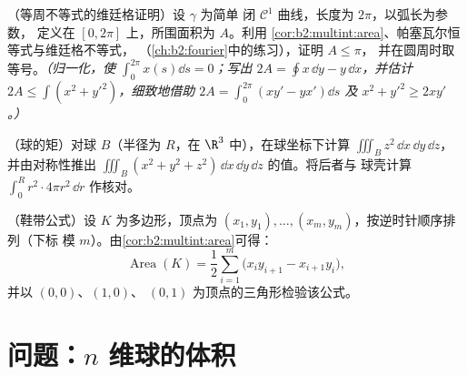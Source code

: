 \begin{exercise}[$\star\star\star$]\label{exo:b2:multint:10}
（等周不等式的维廷格证明）设 $\gamma$ 为简单
闭 $\mathcal{C}^1$ 曲线，长度为 $2\pi$，以弧长为参数，
定义在 $[0, 2\pi]$ 上，所围面积为 $A$。利用
\cref{cor:b2:multint:area}、帕塞瓦尔恒等式与维廷格不等式，
（\cref{ch:b2:fourier}中的练习），证明 $A \leq \pi$，
并在圆周时取等号。\emph{（归一化，使 $\int_0^{2\pi} x(s)\dd s
= 0$；写出 $2A = \oint x\,\dd y - y\,\dd x$，并估计 $2A \leq
\int (x^2 + y'^2)$，细致地借助 $2A = \int_0^{2\pi}(xy' - yx')\dd
s$ 及 $x^2 + y'^2 \geq 2xy'$。）}
\end{exercise}

\begin{exercise}[$\star\star$]\label{exo:b2:multint:11}
（球的矩）对球 $B$（半径为 $R$，在
$\R^3$ 中），在球坐标下计算 $\iiint_B z^2\,\dd x\,\dd y\,\dd z$，
并由对称性推出 $\iiint_B (x^2 + y^2 +
z^2)\,\dd x\,\dd y\,\dd z$ 的值。将后者与
球壳计算 $\int_0^R r^2\cdot4\pi
r^2\,\dd r$ 作核对。
\end{exercise}

\begin{exercise}[$\star\star$]\label{exo:b2:multint:12}
（鞋带公式）设 $K$ 为多边形，顶点为 $(x_1,
y_1), \dots, (x_m, y_m)$，按逆时针顺序排列（下标
模 $m$）。由\cref{cor:b2:multint:area}可得：
\[
\operatorname{Area}(K)
= \frac12\sum_{i=1}^m
\bigl(x_iy_{i+1} - x_{i+1}y_i\bigr) ,
\]
并以 $(0,0)$、$(1,0)$、
$(0,1)$ 为顶点的三角形检验该公式。
\end{exercise}

\section{问题：$n$ 维球的体积}

